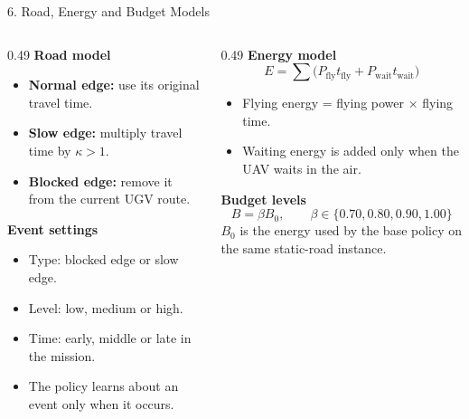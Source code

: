 \documentclass[aspectratio=169,10pt]{beamer}
\begin{document}
\begin{frame}{6. Road, Energy and Budget Models}
\small
\begin{columns}[T]
\begin{column}{0.49\textwidth}
\textbf{Road model}
\begin{itemize}
  \item \textbf{Normal edge:} use its original travel time.
  \item \textbf{Slow edge:} multiply travel time by $\kappa>1$.
  \item \textbf{Blocked edge:} remove it from the current UGV route.
\end{itemize}

\textbf{Event settings}
\begin{itemize}
  \item Type: blocked edge or slow edge.
  \item Level: low, medium or high.
  \item Time: early, middle or late in the mission.
  \item The policy learns about an event only when it occurs.
\end{itemize}
\end{column}
\begin{column}{0.49\textwidth}
\textbf{Energy model}
\[
E=\sum \big(P_{\text{fly}}t_{\text{fly}}+P_{\text{wait}}t_{\text{wait}}\big)
\]
\begin{itemize}
  \item Flying energy = flying power $\times$ flying time.
  \item Waiting energy is added only when the UAV waits in the air.
\end{itemize}

\textbf{Budget levels}
\[
B=\beta B_0,\qquad \beta\in\{0.70,0.80,0.90,1.00\}
\]
$B_0$ is the energy used by the base policy on the same static-road instance.
\end{column}
\end{columns}
\vspace{1mm}
\centering
\setlength{\fboxsep}{1.5mm}
\end{frame}
\end{document}
